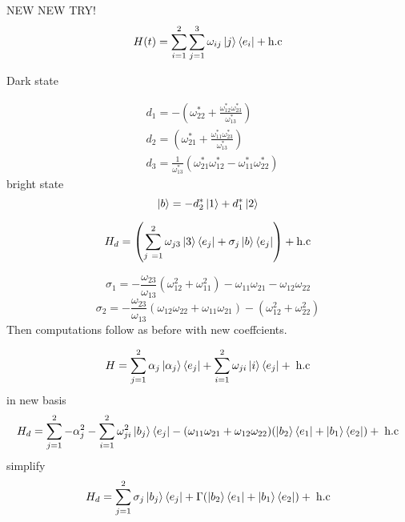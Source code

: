 \vspace{3cm}

NEW NEW TRY!\\

\begin{equation}
H(t) = \sum^2_{i = 1} \sum^3_{j = 1} \omega_{ij} \ket{j}\bra{e_i} + \text{h.c}
\end{equation}

Dark state

\begin{equation}
\begin{aligned} &
d_1 = -\left(\omega^{*}_{22} + \frac{\omega^{*}_{12}\omega^{*}_{23}}{\omega^{*}_{13}} \right)
\\ &
d_2 = \left(\omega^{*}_{21} + \frac{\omega^{*}_{11}\omega^{*}_{23}}{\omega^{*}_{13}}\right)
\\ &
d_3 = \frac{1}{\omega^{*}_{13}}\left( \omega^{*}_{21}\omega^{*}_{12} - \omega^{*}_{11}\omega^{*}_{22}\right)
\end{aligned}
\end{equation}
bright state 
\begin{equation}
\ket{b} = -d_2^{*}\ket{1} + d_1^{*}\ket{2}
\end{equation}


\begin{equation}
H_d = \left(\sum_{j\ = 1}^{2} \omega_{j3}\ket{3}\bra{e_j} + \sigma_j\ket{b}\bra{e_j} \right) + \text{h.c}
\end{equation}

$$
\sigma_1 = -\frac{\omega_{23}}{\omega_{13}}\left(\omega_{12}^2 + \omega_{11}^2 \right) - \omega_{11}\omega_{21} - \omega_{12}\omega_{22}
$$
$$
\sigma_2 = -\frac{\omega_{23}}{\omega_{13}}\left(\omega_{12}\omega_{22} + \omega_{11}\omega_{21}\right) - \left(\omega_{12}^2 + \omega_{22}^2\right)
$$
Then computations follow as before with new coeffcients.
\newpage

\begin{equation}
H = \sum_{j = 1}^{2}\alpha_j \ket{\alpha_j}\bra{e_j} + \sum_{i = 1}^{2} \omega_{ji} \ket{i}\bra{e_j} + \;\text{h.c}
\end{equation}
in new basis
\begin{equation}
H_d = \sum_{j = 1}^2 -\alpha_j^2 - \sum_{i = 1}^{2}\omega_{ji}^{2}\ket{b_j}\bra{e_j} -(\omega_{11}\omega_{21} + \omega_{12}\omega_{22})(\ket{b_2}\bra{e_1} + \ket{b_1}\bra{e_2}) + \; \text{h.c}
\end{equation}
simplify 
\begin{equation}
H_d = \sum_{j = 1}^2 \sigma_j\ket{b_j}\bra{e_j} + \Gamma (\ket{b_2}\bra{e_1} + \ket{b_1}\bra{e_2}) + \; \text{h.c}
\end{equation}

